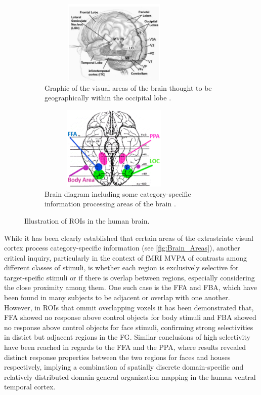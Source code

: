 \begin{figure}[htbp]
 	\centering
	\begin{subfigure}{0.49\textwidth}
		\centering
		\includegraphics[width = 0.8\textwidth, height = 4cm]{assets/images/visual_areas.png}
		\caption{Graphic of the visual areas of the brain thought to be geographically within the occipital lobe \cite{visual_centers}.}
		\label{fig:Visual_areas}
	\end{subfigure}
	\hfill
	\begin{subfigure}{0.49\textwidth}
		\centering
	 	\includegraphics[width = 0.8\textwidth, height = 4cm]{assets/images/brain_areas.png}
		\caption{Brain diagram including some category-specific information processing areas of the brain \cite{prosopagnosia}.}
		\label{fig:Specific_areas}
	\end{subfigure}
	\caption{Illustration of \gls{ROIs} in the human brain.}
 	\label{fig:Brain_Areas}
\end{figure}

While it has been clearly established that certain areas of the extrastriate visual cortex process category-specific information (see \autoref{fig:Brain_Areas}), another critical inquiry, particularly in the context of \gls{fMRI} \gls{MVPA} of contrasts among different classes of stimuli, is whether each region is exclusively selective for target-speific stimuli or if there is overlap between regions, especially considering the close proximity among them. One such case is the \gls{FFA} and \gls{FBA}, which have been found in many subjects to be adjacent or overlap with one another. However, in \gls{ROIs} that ommit overlapping voxels it has been demonstrated \cite{Schwarzlose2005} that, \gls{FFA} showed no response above control objects for body stimuli and \gls{FBA} showed no response above control objects for face stimuli, confirming strong selectivities in distict but adjacent regions in the \gls{FG}. Similar conclusions of high selectivity have been reached \cite{Mengjin2022} in regards to the \gls{FFA} and the \gls{PPA}, where results revealed distinct response properties between the two regions for faces and houses respectively, implying a combination of spatially discrete domain-specific and relatively distributed domain-general organization mapping in the human ventral temporal cortex.

